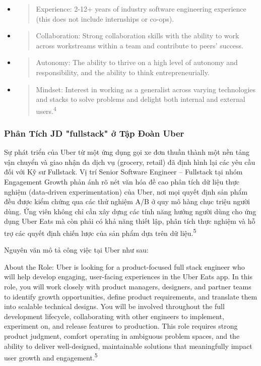 \documentclass[12pt,a4paper]{article}
\begin{document}
\begin{itemize}
\item
  \begin{quote}
  Experience: 2-12+ years of industry software engineering experience (this does not include internships or co-ops).
  \end{quote}
\item
  \begin{quote}
  Collaboration: Strong collaboration skills with the ability to work across workstreams within a team and contribute to peers' success.
  \end{quote}
\item
  \begin{quote}
  Autonomy: The ability to thrive on a high level of autonomy and responsibility, and the ability to think entrepreneurially.
  \end{quote}
\item
  \begin{quote}
  Mindset: Interest in working as a generalist across varying technologies and stacks to solve problems and delight both internal and external users.\textsuperscript{4}
  \end{quote}
\end{itemize}

\subsubsection{Phân Tích JD "fullstack" ở Tập Đoàn Uber}

Sự phát triển của Uber từ một ứng dụng gọi xe đơn thuần thành một nền tảng vận chuyển và giao nhận đa dịch vụ (grocery, retail) đã định hình lại các yêu cầu đối với Kỹ sư Fullstack. Vị trí Senior Software Engineer -- Fullstack tại nhóm Engagement Growth phản ánh rõ nét văn hóa đề cao phân tích dữ liệu thực nghiệm (data-driven experimentation) của Uber, nơi mọi quyết định sản phẩm đều được kiểm chứng qua các thử nghiệm A/B ở quy mô hàng chục triệu người dùng. Ứng viên không chỉ cần xây dựng các tính năng hướng người dùng cho ứng dụng Uber Eats mà còn phải có khả năng thiết lập, phân tích thực nghiệm và hỗ trợ các quyết định chiến lược của sản phẩm dựa trên dữ liệu.\textsuperscript{5}

Nguyên văn mô tả công việc tại Uber như sau:

About the Role: Uber is looking for a product-focused full stack engineer who will help develop engaging, user-facing experiences in the Uber Eats app. In this role, you will work closely with product managers, designers, and partner teams to identify growth opportunities, define product requirements, and translate them into scalable technical designs. You will be involved throughout the full development lifecycle, collaborating with other engineers to implement, experiment on, and release features to production. This role requires strong product judgment, comfort operating in ambiguous problem spaces, and the ability to deliver well-designed, maintainable solutions that meaningfully impact user growth and engagement.\textsuperscript{5}
\end{document}
